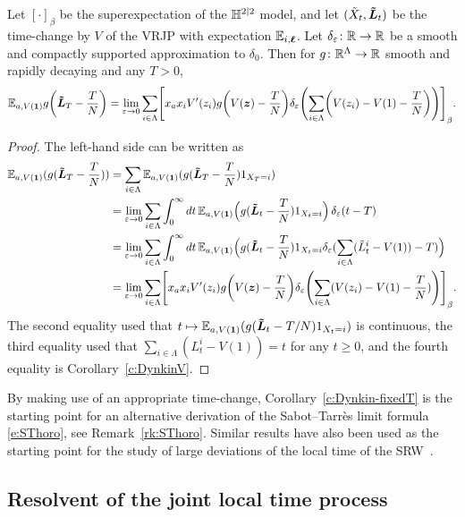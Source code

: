 \documentclass[11pt,a4paper]{article}
\let\originalleft\left
\let\originalright\right
\renewcommand{\left}{\mathopen{}\mathclose\bgroup\originalleft}
\renewcommand{\right}{\aftergroup\egroup\originalright}
\begin{document}
\begin{corollary} 
  \label{c:Dynkin-fixedT}
  Let $[\cdot]_\beta$ be the superexpectation of the $\mathbb{H}^{2|2}$ model, and
  let $(\tilde X_t,\boldsymbol{\tilde L}_t)$ be the time-change by $V$ of the VRJP
  with expectation $\mathbb{E}_{i,\boldsymbol{\ell}}$.
  Let $\delta_\varepsilon\colon \mathbb{R} \to \mathbb{R}$ be a smooth and compactly supported
  approximation to $\delta_{0}$. 
  Then for $g\colon \mathbb{R}^{\Lambda}\to \mathbb{R}$ smooth and rapidly decaying
  and any $T>0$,
  \begin{equation*} \label{e:Dynkin-fixedT}
    \E_{a,V(\V{1})}g\left(\V{\tilde L}_T-\frac{T}{N}\right)
    =
    \lim_{\epsilon\to 0}\sum_{i\in\Lambda} \qa{x_ax_i V'(z_i) g\left(V(\V{z})-\frac{T}{N}\right) \delta_\epsilon\left(\sum_{i\in\Lambda} \left(V(z_i)-V(1)-\frac{T}{N}\right)\right)}_{\beta}.
  \end{equation*}
\end{corollary}
\begin{proof}
  The left-hand side can be written as
  \begin{align}
    \E_{a,V(\V{1})}(g(\V{\tilde L}_T-\frac{T}{N}))
    &=
      \sum_{i\in\Lambda} \E_{a,V(\V{1})}(g(\V{\tilde L}_T-\frac{T}{N})1_{X_T=i})
      \nnb
    &=
      \lim_{\epsilon\to 0}\sum_{i\in\Lambda} \int_0^\infty dt \,
      \E_{a,V(\V{1})}\pB{g(\V{\tilde L}_t-\frac{T}{N})1_{X_t=i}} \,
      \delta_\epsilon(t-T) 
      \nnb
    &=
      \lim_{\epsilon\to 0}\sum_{i\in\Lambda} \int_0^\infty dt \,
      \E_{a,V(\V{1})}\pB{g(\V{\tilde L}_t-\frac{T}{N})  1_{X_t=i} \delta_\epsilon(\sum_{i\in\Lambda} (\tilde L_t^i - V(1))-T)}
      \nnb
    &=
       \lim_{\epsilon\to 0}\sum_{i\in\Lambda} \qa{ x_a x_i V'(z_i) g\pa{V(\V{z})-\frac{T}{N}} \delta_\epsilon\pa{\sum_{i\in\Lambda} (V(z_i)-V(1)-\frac{T}{N})} }_\beta.
  \end{align}
  The second equality used that $t\mapsto
  \mathbb{E}_{a,V(\boldsymbol{1})}(g(\boldsymbol{\tilde L}_t-T/N)1_{X_t=i})$ is continuous,
  the third equality used that $\sum_{i\in\Lambda} (L_t^i - V(1))=t$ for any $t\geq 0$,
  and the fourth equality is Corollary~\ref{c:DynkinV}.
\end{proof}

By making use of an appropriate time-change, 
Corollary~\ref{c:Dynkin-fixedT} is the starting point for an
alternative derivation of the Sabot--Tarr\`{e}s limit formula \eqref{e:SThoro}, 
see Remark~\ref{rk:SThoro}.  Similar results have also been used as the
starting point for the study of large deviations of the local time of the
SRW~\cite[Theorem~1]{MR2330973}.


\subsection{Resolvent of the joint local time process}
\label{sec:HK}
\end{document}
